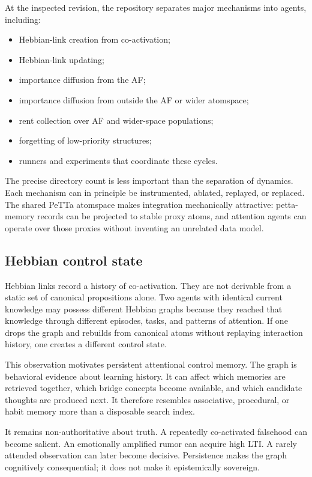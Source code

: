 \documentclass[11pt]{article}
\begin{document}
At the inspected revision, the repository separates major mechanisms into
agents, including:
\begin{itemize}
  \item Hebbian-link creation from co-activation;
  \item Hebbian-link updating;
  \item importance diffusion from the AF;
  \item importance diffusion from outside the AF or wider atomspace;
  \item rent collection over AF and wider-space populations;
  \item forgetting of low-priority structures;
  \item runners and experiments that coordinate these cycles.
\end{itemize}

The precise directory count is less important than the separation of dynamics.
Each mechanism can in principle be instrumented, ablated, replayed, or replaced.
The shared PeTTa atomspace makes integration mechanically attractive: petta-memory
records can be projected to stable proxy atoms, and attention agents can operate
over those proxies without inventing an unrelated data model.

\subsection{Hebbian control state}

Hebbian links record a history of co-activation.  They are not derivable from a
static set of canonical propositions alone.  Two agents with identical current
knowledge may possess different Hebbian graphs because they reached that
knowledge through different episodes, tasks, and patterns of attention.  If one
drops the graph and rebuilds from canonical atoms without replaying interaction
history, one creates a different control state.

This observation motivates persistent attentional control memory.  The graph
is behavioral evidence about learning history.  It can affect which memories
are retrieved together, which bridge concepts become available, and which
candidate thoughts are produced next.  It therefore resembles associative,
procedural, or habit memory more than a disposable search index.

It remains non-authoritative about truth.  A repeatedly co-activated falsehood
can become salient.  An emotionally amplified rumor can acquire high LTI.  A
rarely attended observation can later become decisive.  Persistence makes the
graph cognitively consequential; it does not make it epistemically sovereign.
\end{document}
